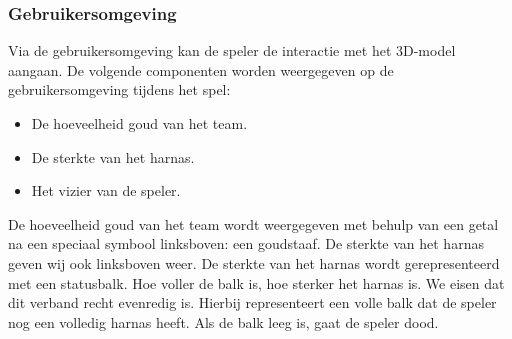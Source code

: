 \documentclass[a4paper,11pt, twoside]{article}
\begin{document}
    \subsubsection{Gebruikersomgeving}
    \label{sec:UI}

    Via de gebruikersomgeving kan de speler de interactie met het 3D-model aangaan. De volgende componenten worden weergegeven op de gebruikersomgeving tijdens het spel:
    \begin{itemize}
    \item De hoeveelheid goud van het team.
    \item De sterkte van het harnas.
    \item Het vizier van de speler.
    \end{itemize}

    De hoeveelheid goud van het team wordt weergegeven met behulp van een getal na een speciaal symbool linksboven: een goudstaaf. De sterkte van het harnas geven wij ook linksboven weer. De sterkte van het harnas wordt gerepresenteerd met een statusbalk. Hoe voller de balk is, hoe sterker het harnas is. We eisen dat dit verband recht evenredig is. Hierbij representeert een volle balk dat de speler nog een volledig harnas heeft. Als de balk leeg is, gaat de speler dood.
\end{document}
